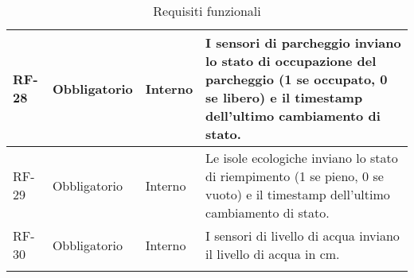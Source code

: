 \begin{longtable}{|>{\centering\arraybackslash}m{}|>{\centering\arraybackslash}m{}|>{\centering\arraybackslash}m{}|>{\centering\arraybackslash}m{}|}
	RF-28           & Obbligatorio        & Interno        & I sensori di parcheggio inviano lo stato di occupazione del parcheggio (1 se occupato, 0 se libero) e il timestamp dell'ultimo cambiamento di stato.                                                                                                                                                    \\\hline
	RF-29           & Obbligatorio        & Interno        & Le isole ecologiche inviano lo stato di riempimento (1 se pieno, 0 se vuoto) e il timestamp dell'ultimo cambiamento di stato.                                                                                                                                                                           \\\hline
	RF-30           & Obbligatorio        & Interno        & I sensori di livello di acqua inviano il livello di acqua in cm.                                                                                                                                                                                                                                        \\\hline
	\caption{Requisiti funzionali}
	\label{table:1}
\end{longtable}

